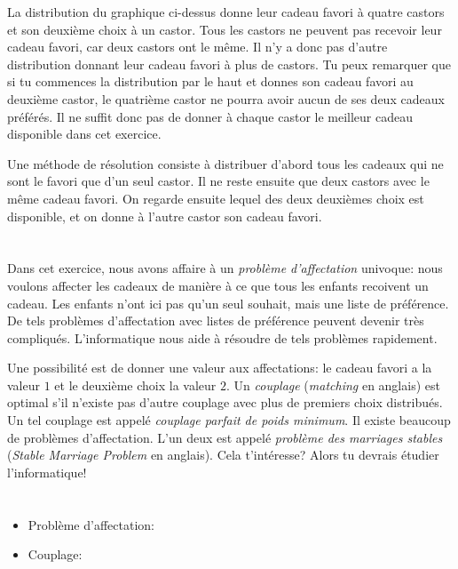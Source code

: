 {{{\centering%
\par}

La distribution du graphique ci-dessus donne leur cadeau favori à quatre castors et son deuxième choix à un castor. Tous les castors ne peuvent pas recevoir leur cadeau favori, car deux castors ont le même. Il n’y a donc pas d’autre distribution donnant leur cadeau favori à plus de castors. Tu peux remarquer que si tu commences la distribution par le haut et donnes son cadeau favori au deuxième castor, le quatrième castor ne pourra avoir aucun de ses deux cadeaux préférés. Il ne suffit donc pas de donner à chaque castor le meilleur cadeau disponible dans cet exercice.

Une méthode de résolution consiste à distribuer d’abord tous les cadeaux qui ne sont le favori que d’un seul castor. Il ne reste ensuite que deux castors avec le même cadeau favori. On regarde ensuite lequel des deux deuxièmes choix est disponible, et on donne à l’autre castor son cadeau favori.



\section*{\BrochureItsInformatics}
Dans cet exercice, nous avons affaire à un \emph{problème d’affectation} univoque: nous voulons affecter les cadeaux de manière à ce que tous les enfants recoivent un cadeau. Les enfants n’ont ici pas qu’un seul souhait, mais une liste de préférence. De tels problèmes d’affectation avec listes de préférence peuvent devenir très compliqués. L’informatique nous aide à résoudre de tels problèmes rapidement.

Une possibilité est de donner une valeur aux affectations: le cadeau favori a la valeur $1$ et le deuxième choix la valeur $2$. Un \emph{couplage} (\emph{matching} en anglais) est optimal s’il n’existe pas d’autre couplage avec plus de premiers choix distribués. Un tel couplage est appelé \emph{couplage parfait de poids minimum}. Il existe beaucoup de problèmes d’affectation. L’un deux est appelé \emph{problème des marriages stables} (\emph{Stable Marriage Problem} en anglais). Cela t’intéresse? Alors tu devrais étudier l’informatique!



\section*{\BrochureWebsitesAndKeywords}
{\raggedright
\begin{itemize}
  \item Problème d’affectation: \href{https://fr.wikipedia.org/wiki/Probl\%C3\%A8me_d\%27affectation}{}
  \item Couplage: \href{https://fr.wikipedia.org/wiki/Couplage_(th\%C3\%A9orie_des_graphes)}{}
\end{itemize}


}}}
